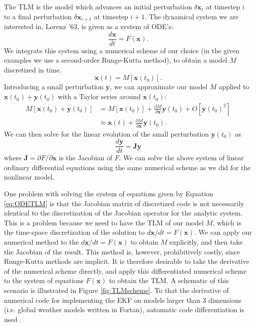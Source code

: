 \documentclass[10pt,letterpaper]{article}
\newcommand{\mbx}{\mathbf{x}}
\newcommand{\mby}{\mathbf{y}}
\begin{document}
The TLM is the model which advances an initial perturbation $\delta \mbx_{i}$ at timestep $i$ to a final perturbation $\delta \mbx_{i+1}$ at timestep $i+1$.
The dynamical system we are interested in, Lorenz '63, is given as a system of ODE's:
\[ \frac{d\mbx}{dt} = F(\mbx) .\]
We integrate this system using a numerical scheme of our choice (in the given examples we use a second-order Runge-Kutta method), to obtain a model $M$ discretized in time.
\[ \mbx(t) = M[ \mbx(t_0) ] .\]
Introducing a small perturbation $\mby$, we can approximate our model $M$ applied to $\mbx(t_0) + \mby(t_0)$ with a Taylor series around $\mbx(t_0)$:
\begin{align*} M[ \mbx(t_0) + \mby(t_0) ] &= M [ \mbx(t_0) ] + \frac{\partial M}{\partial \mbx} \mby(t_0) + O [ \mby(t_0) ^2 ]\\ &\approx \mbx(t) + \frac{\partial M}{\partial \mbx} \mby(t_0) .\end{align*}
We can then solve for the linear evolution of the small perturbation $\mby(t_0)$ as 
\begin{equation} \frac{d\mby }{dt } = \mathbf{J} \mby \label{eq:ODETLM} \end{equation}
where $\mathbf{J} = \partial F / \partial \mbx$ is the Jacobian of $F$.
We can solve the above system of linear ordinary differential equations using the same numerical scheme as we did for the nonlinear model.

One problem with solving the system of equations given by Equation \ref{eq:ODETLM} is that the Jacobian matrix of discretized code is not necessarily identical to the discretization of the Jacobian operator for the analytic system.
This is a problem because we need to have the TLM of our model $M$, which is the time-space discretization of the solution to $d\mbx/dt = F(\mbx)$.
We can apply our numerical method to the $d\mbx/dt = F(\mbx)$ to obtain $M$ explicitly, and then take the Jacobian of the result.
This method is, however, prohibitively costly, since Runge-Kutta methods are implicit.
It is therefore desirable to take the derivative of the numerical scheme directly, and apply this differentiated numerical scheme to the system of equations $F(\mbx)$ to obtain the TLM.
A schematic of this scenario is illustrated in Figure \ref{fig:TLMscheme}.
To that the derivative of numerical code for implementing the EKF on models larger than 3 dimensions (i.e. global weather models written in Fortan), automatic code differentiation is used \cite{autodiff1981}.
\end{document}
